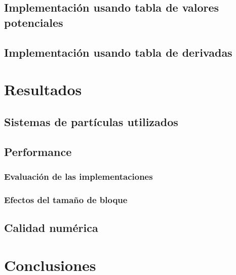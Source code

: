 \documentclass[a4paper,10pt]{report}
\begin{document}
\section{Implementación usando tabla de valores potenciales}
\section{Implementación usando tabla de derivadas}













\chapter{Resultados}
\section{Sistemas de partículas utilizados}
\section{Performance}
\subsection{Evaluación de las implementaciones}
\subsection{Efectos del tamaño de bloque}
\section{Calidad numérica}














\chapter{Conclusiones}
\end{document}
